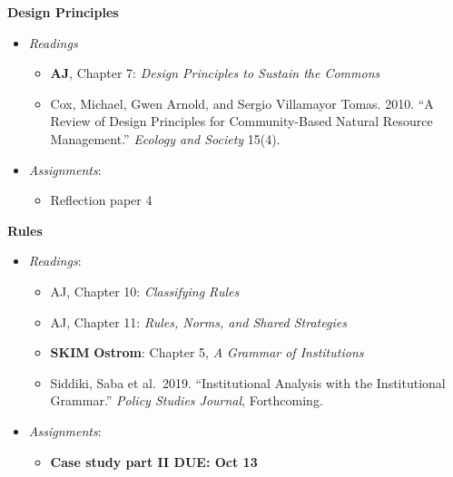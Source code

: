 \week \textbf{Design Principles}

\begin{itemize}

\item
  \emph{Readings}

  \begin{itemize}
  
  \item
    \textbf{AJ}, Chapter 7: \emph{Design Principles to Sustain the
    Commons}
  \item
    Cox, Michael, Gwen Arnold, and Sergio Villamayor Tomas. 2010. ``A
    Review of Design Principles for Community-Based Natural Resource
    Management.'' \emph{Ecology and Society} 15(4).
  \end{itemize}
\item
  \emph{Assignments}:

  \begin{itemize}
  
  \item
    Reflection paper 4
  \end{itemize}
\end{itemize}

\week \textbf{Rules}

\begin{itemize}

\item
  \emph{Readings}:

  \begin{itemize}
  
  \item
    AJ, Chapter 10: \emph{Classifying Rules}
  \item
    AJ, Chapter 11: \emph{Rules, Norms, and Shared Strategies}
  \item
    \textbf{SKIM} \textbf{Ostrom}: Chapter 5, \emph{A Grammar of
    Institutions}
  \item
    Siddiki, Saba et al.~2019. ``Institutional Analysis with the
    Institutional Grammar.'' \emph{Policy Studies Journal}, Forthcoming.
  \end{itemize}
\item
  \emph{Assignments}:

  \begin{itemize}
  
  \item
    \textbf{Case study part II DUE: Oct 13}
  \end{itemize}
\end{itemize}

